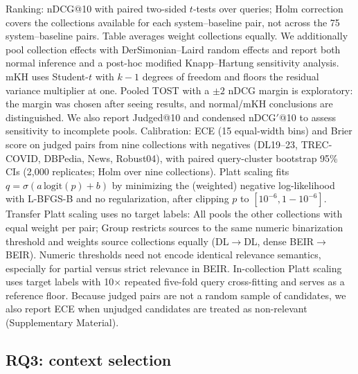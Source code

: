 Ranking: nDCG@10 with paired two-sided $t$-tests over queries; Holm correction\cite{holm1979} covers the collections available for each system--baseline pair, not across the 75 system--baseline pairs. Table averages weight collections equally. We additionally pool collection effects with DerSimonian--Laird random effects\cite{dersimonian1986} and report both normal inference and a post-hoc modified Knapp--Hartung sensitivity analysis\cite{rover2015mkh}. mKH uses Student-$t$ with $k-1$ degrees of freedom and floors the residual variance multiplier at one. Pooled TOST\cite{schuirmann1987tost} with a $\pm2$ nDCG margin is exploratory: the margin was chosen after seeing results, and normal/mKH conclusions are distinguished. We also report Judged@10 and condensed nDCG$'$@10\cite{sakai2007alternatives} to assess sensitivity to incomplete pools.
Calibration: ECE (15 equal-width bins) and Brier score\cite{brier1950} on judged pairs from nine collections with negatives (DL19--23, TREC-COVID, DBPedia, News, Robust04), with paired query-cluster bootstrap 95\% CIs (2,000 replicates; Holm over nine collections). Platt scaling fits $q=\sigma(a\,\mathrm{logit}(p)+b)$ by minimizing the (weighted) negative log-likelihood with L-BFGS-B and no regularization, after clipping $p$ to $[10^{-6},1-10^{-6}]$. Transfer Platt scaling uses no target labels: All pools the other collections with equal weight per pair; Group restricts sources to the same numeric binarization threshold and weights source collections equally (DL$\to$DL, dense BEIR$\to$BEIR). Numeric thresholds need not encode identical relevance semantics, especially for partial versus strict relevance in BEIR. In-collection Platt scaling uses target labels with 10$\times$ repeated five-fold query cross-fitting and serves as a reference floor.
Because judged pairs are not a random sample of candidates, we also report ECE when unjudged candidates are treated as non-relevant (Supplementary Material).

\subsection{RQ3: context selection}


